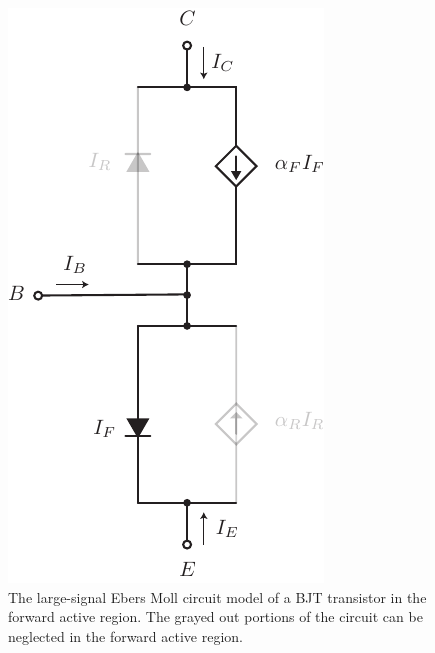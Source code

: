 \begin{figure}[tb]
\begin{center}
\includegraphics[scale=.7]{slide18_ebers_moll_approx}
\end{center}
\caption{The large-signal Ebers Moll circuit model of a BJT transistor in the forward active region.  The grayed out portions of the circuit can be neglected in the forward active region.} \label{fig:slide18_ebers_moll_approx}
\end{figure}
